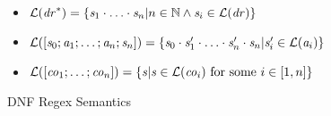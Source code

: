 \begin{figure}
\begin{itemize}
\item $\mathcal{L}{}(\mathit{dr}^*) =
\{\mathit{s}_1\cdot\ldots\cdot\mathit{s}_n | n\in\mathbb{N} \wedge \mathit{s}_i\in\mathcal{L}{}(\mathit{dr})\}$
\item $\mathcal{L}{}([\mathit{s}_0;\mathit{a}_1;\ldots;\mathit{a}_n;\mathit{s}_n])=
\{\mathit{s}_0\cdot\mathit{s}_1'\cdot\ldots\cdot\mathit{s}_n'\cdot\mathit{s}_n | \mathit{s}_i'\in\mathcal{L}{}(\mathit{a}_i)\}$
\item $\mathcal{L}{}([\mathit{co}_1;\ldots;\mathit{co}_n])=
\{\mathit{s} | \mathit{s} \in \mathcal{L}{}(\mathit{co}_i) \text{ for some $i\in[1,n]$}\}$
\end{itemize}
\caption{DNF Regex Semantics}
\label{fig:dnf-regex-semantics}
\end{figure}
